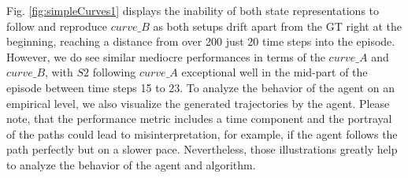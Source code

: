 Fig. \ref{fig:simpleCurves1} displays the inability of both state representations to follow and reproduce $curve\_B$ as both setups drift apart from the GT right at the beginning, reaching a distance from over 200 just 20 time steps into the episode. However, we do see similar mediocre performances in terms of the $curve\_A$ and $curve\_B$, with $S2$ following $curve\_A$ exceptional well in the mid-part of the episode between time steps 15 to 23. To analyze the behavior of the agent on an empirical level, we also visualize the generated trajectories by the agent. Please note, that the performance metric includes a  time component and the portrayal of the paths could lead to misinterpretation, for example, if the agent follows the path perfectly but on a slower pace. Nevertheless, those illustrations greatly help to analyze the behavior of the agent and algorithm. 

